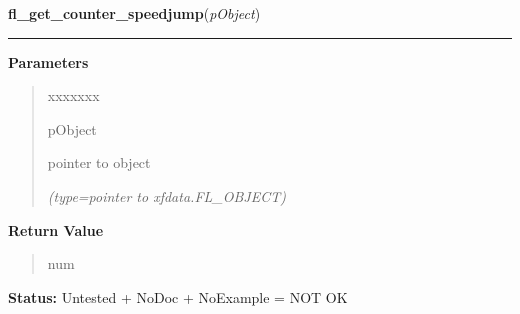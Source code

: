 \hspace{.8\funcindent}\begin{boxedminipage}{\funcwidth}

    \raggedright \textbf{fl\_get\_counter\_speedjump}(\textit{pObject})

    \vspace{-1.5ex}

    \rule{\textwidth}{0.5\fboxrule}
\setlength{\parskip}{2ex}
\setlength{\parskip}{1ex}
      \textbf{Parameters}
      \vspace{-1ex}

      \begin{quote}
        \begin{Ventry}{xxxxxxx}

          \item[pObject]

          pointer to object

            {\it (type=pointer to xfdata.FL\_OBJECT)}

        \end{Ventry}

      \end{quote}

      \textbf{Return Value}
    \vspace{-1ex}

      \begin{quote}
      num

      \end{quote}

\textbf{Status:} Untested + NoDoc + NoExample = NOT OK



    \end{boxedminipage}

    \label{xformslib:library:fl_set_counter_speedjump}

    \vspace{0.5ex}

